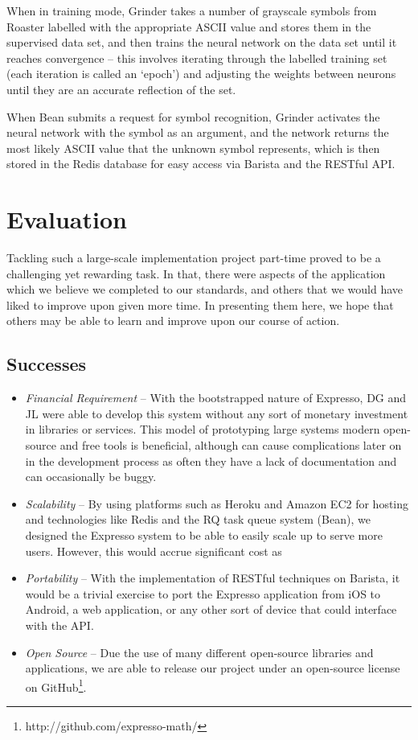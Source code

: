 \documentclass{acm_proc_article-sp}
\begin{document}
When in training mode, Grinder takes a number of grayscale symbols from Roaster labelled with the appropriate ASCII value and stores them in the supervised data set, and then trains the neural network on the data set until it reaches convergence -- this involves iterating through the labelled training set (each iteration is called an `epoch') and adjusting the weights between neurons until they are an accurate reflection of the set. 

When Bean submits a request for symbol recognition, Grinder activates the neural network with the symbol as an argument, and the network returns the most likely ASCII value that the unknown symbol represents, which is then stored in the Redis database for easy access via Barista and the RESTful API.


\section{Evaluation}
Tackling such a large-scale implementation project part-time proved to be a challenging yet rewarding task. In that, there were aspects of the application which we believe we completed to our standards, and others that we would have liked to improve upon given more time. In presenting them here, we hope that others may be able to learn and improve upon our course of action.

\subsection{Successes}
\begin{itemize}
	\item{\emph{Financial Requirement}} -- With the bootstrapped nature of Expresso, DG and JL were able to develop this system without any sort of monetary investment in libraries or services. This model of prototyping large systems modern open-source and free tools is beneficial, although can cause complications later on in the development process as often they have a lack of documentation and can occasionally be buggy.
	\item{\emph{Scalability}} -- By using platforms such as Heroku and Amazon EC2 for hosting and technologies like Redis and the RQ task queue system (Bean), we designed the Expresso system to be able to easily scale up to serve more users. However, this would accrue significant cost as 
	\item{\emph{Portability}} -- With the implementation of RESTful techniques on Barista, it would be a trivial exercise to port the Expresso application from iOS to Android, a web application, or any other sort of device that could interface with the API.
	\item{\emph{Open Source}} -- Due the use of many different open-source libraries and applications, we are able to release our project under an open-source license on GitHub\footnote{http://github.com/expresso-math/}.

\end{itemize}
\end{document}
